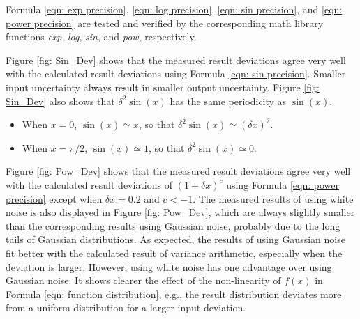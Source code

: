 \documentclass[twoside]{article}
\numberwithin{equation}{section}
\begin{document}
Formula \eqref{eqn: exp precision}, \eqref{eqn: log precision}, \eqref{eqn: sin precision}, and \eqref{eqn: power precision} are tested and verified by the corresponding math library functions \textit{exp}, \textit{log}, \textit{sin}, and \textit{pow}, respectively.

Figure \ref{fig: Sin_Dev} shows that the measured result deviations agree very well with the calculated result deviations using Formula \eqref{eqn: sin precision}.
Smaller input uncertainty always result in smaller output uncertainty.
Figure \ref{fig: Sin_Dev} also shows that $\delta^2 \sin(x)$ has the same periodicity as $\sin(x)$.
\begin{itemize}
\item When $x=0$, $\sin(x) \simeq x$, so that $\delta^2 \sin(x) \simeq (\delta x)^2$.
\item When $x=\pi/2$, $\sin(x) \simeq 1$, so that $\delta^2 \sin(x) \simeq 0$.
\end{itemize}

Figure \ref{fig: Pow_Dev} shows that the measured result deviations agree very well with the calculated result deviations of $(1 \pm \delta x)^c$ using Formula \eqref{eqn: power precision} except when $\delta x =0.2$ and $c < -1$.
The measured results of using white noise is also displayed in Figure \ref{fig: Pow_Dev}, which are always slightly smaller than the corresponding results using Gaussian noise, probably due to the long tails of Gaussian distributions. 
As expected, the results of using Gaussian noise fit better with the calculated result of variance arithmetic, especially when the deviation is larger.
However, using white noise has one advantage over using Gaussian noise: It shows clearer the effect of the non-linearity of $f(x)$ in Formula \eqref{eqn: function distribution}, e.g., the result distribution deviates more from a uniform distribution for a larger input deviation. 
\end{document}
